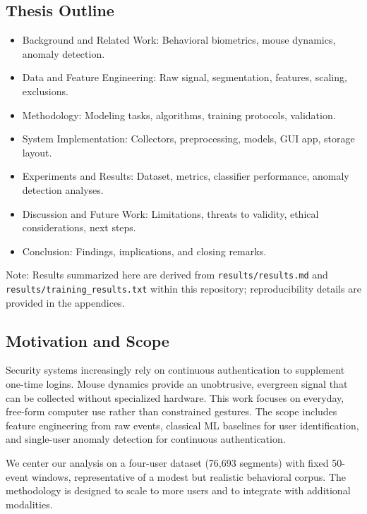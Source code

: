 \documentclass[
  12pt,
]{article}
\providecommand{\tightlist}{%
  \setlength{\itemsep}{0pt}\setlength{\parskip}{0pt}}
\begin{document}
\subsection{Thesis Outline}\label{thesis-outline}

\begin{itemize}
\tightlist
\item
  Background and Related Work: Behavioral biometrics, mouse dynamics,
  anomaly detection.
\item
  Data and Feature Engineering: Raw signal, segmentation, features,
  scaling, exclusions.
\item
  Methodology: Modeling tasks, algorithms, training protocols,
  validation.
\item
  System Implementation: Collectors, preprocessing, models, GUI app,
  storage layout.
\item
  Experiments and Results: Dataset, metrics, classifier performance,
  anomaly detection analyses.
\item
  Discussion and Future Work: Limitations, threats to validity, ethical
  considerations, next steps.
\item
  Conclusion: Findings, implications, and closing remarks.
\end{itemize}

Note: Results summarized here are derived from
\texttt{results/results.md} and \texttt{results/training\_results.txt}
within this repository; reproducibility details are provided in the
appendices.

\subsection{Motivation and Scope}\label{motivation-and-scope}

Security systems increasingly rely on continuous authentication to
supplement one-time logins. Mouse dynamics provide an unobtrusive,
evergreen signal that can be collected without specialized hardware.
This work focuses on everyday, free-form computer use rather than
constrained gestures. The scope includes feature engineering from raw
events, classical ML baselines for user identification, and single-user
anomaly detection for continuous authentication.

We center our analysis on a four-user dataset (76,693 segments) with
fixed 50-event windows, representative of a modest but realistic
behavioral corpus. The methodology is designed to scale to more users
and to integrate with additional modalities.
\end{document}
